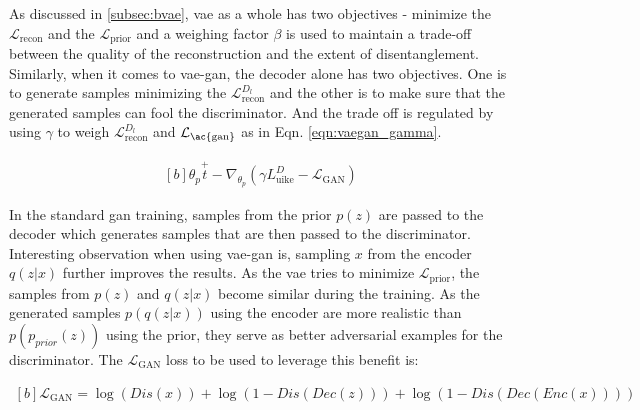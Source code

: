 As discussed in \ref{subsec:bvae}, \ac{vae} as a whole has two objectives - minimize the $\mathcal{L}_{\text {recon}}$ and the $\mathcal{L}_{\text {prior}}$ and a weighing factor $\beta$ is used to maintain a trade-off between the quality of the reconstruction and the extent of disentanglement. Similarly, when it comes to \ac{vae}-\ac{gan}, the decoder alone has two objectives. One is to generate samples minimizing the $\mathcal{L}_{\text {recon}}^{D_{l}}$ and the other is to make sure that the generated samples can fool the discriminator. And the trade off is regulated by using $\gamma$ to weigh $\mathcal{L}_{\text {recon}}^{D_{l}}$ and $\mathcal{L}_{\text {\ac{gan}}}$ as in Eqn. \ref{eqn:vaegan_gamma}.
 
\begin{equation} \label{eqn:vaegan_gamma}
    \begin{gathered}[b]
        \theta_{p} \stackrel{+}{t}-\nabla_{\theta_{p}}\left(\gamma L_{\mathrm{uike}}^{D}-\mathcal{L}_{\mathrm{GAN}}\right)
    \end{gathered}
\end{equation}

In the standard \ac{gan} training, samples from the prior $p(z)$ are passed to the decoder which generates samples that are then passed to the discriminator. Interesting observation when using \ac{vae}-\ac{gan} is, sampling $x$ from the encoder $q(z|x)$ further improves the results. As the \ac{vae} tries to minimize $\mathcal{L}_{\text{prior}}$, the samples from $p(z)$ and $q(z|x)$ become similar during the training. As the generated samples $p(q(z|x))$ using the encoder are more realistic than $p(p_{prior}(z))$ using the prior, they serve as better adversarial examples for the discriminator. The $\mathcal{L}_{\mathrm{GAN}}$ loss to be used to leverage this benefit is: 


\begin{equation} \label{eqn:vaegan_ganloss}
    \begin{gathered}[b]
        \mathcal{L}_{\mathrm{GAN}}=\log (Dis(x))+\log (1-Dis(Dec(z)))+\log (1-Dis(Dec(Enc(x))))
    \end{gathered}
\end{equation}


